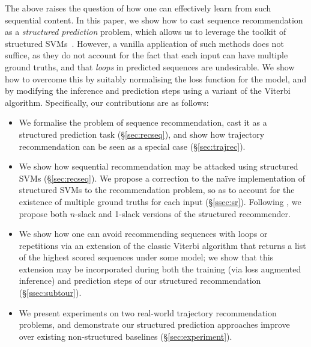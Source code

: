 The above raises the question of how one can effectively learn from such sequential content.
In this paper, we show how to cast sequence recommendation as a \emph{structured prediction} problem,
which allows us to leverage the toolkit of structured SVMs~\citep{tsochantaridis2005large}.
However, a vanilla application of such methods does not suffice,
as they do not account for the fact that each input can have multiple ground truths,
and that \emph{loops} in predicted sequences are undesirable.
We show how to overcome this by
suitably normalising the loss function for the model,
and by modifying the inference and prediction steps using a variant of the Viterbi algorithm.
Specifically, our contributions are as follows:
\begin{itemize}[noitemsep,leftmargin=12pt]\itemmoveup
	\item We formalise the problem of sequence recommendation, cast it as a structured prediction task (\S\ref{sec:recseq}), and show how trajectory recommendation can be seen as a special case (\S\ref{sec:trajrec}).

	\item We show how sequential recommendation may be attacked using structured SVMs (\S\ref{sec:recseq}).
	We propose a correction to the na\"{i}ve implementation of structured SVMs to the recommendation problem, so as to account for the existence of multiple ground truths for each input (\S\ref{ssec:sr}). Following \citep{joachims2009cutting}, we propose both $n$-slack and 1-slack versions of the structured recommender.%
	
	\item We show how one can avoid recommending sequences with loops or repetitions via an extension of the classic Viterbi algorithm that returns a list of the highest scored sequences under some model; we show that this extension may be incorporated during both the training (via loss augmented inference) and prediction steps of our structured recommendation (\S\ref{ssec:subtour}).
	
	\item We present experiments on two real-world trajectory recommendation problems, and demonstrate our structured prediction approaches improve over existing non-structured baselines (\S\ref{sec:experiment}).\itemmoveup
\end{itemize}

